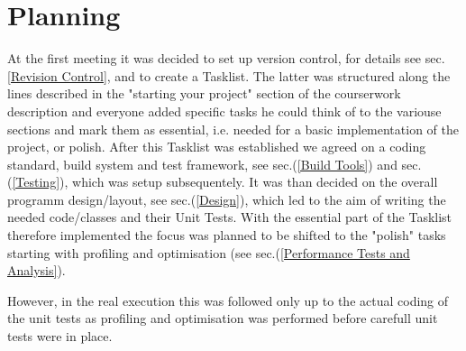 \section{Planning}
\label{Planning}
At the first meeting it was decided to set up version control, for details see sec.\ref{Revision Control}, and to create a Tasklist.
The latter was structured along the lines described in the "starting your project" section of the courserwork description and everyone
added specific tasks he could think of to the variouse sections and mark them as essential, i.e. needed for a basic implementation of the project, or polish.
After this Tasklist was established we agreed on a coding standard, build system and test framework, see sec.(\ref{Build Tools}) and sec.(\ref{Testing}), which was setup subsequentely.
It was than decided on the overall programm design/layout, see sec.(\ref{Design}), which led to the aim of writing the needed code/classes and their Unit Tests.
With the essential part of the Tasklist therefore implemented the focus was planned to be shifted to the "polish" tasks starting with profiling and optimisation (see sec.(\ref{Performance Tests and Analysis}).

However, in the real execution this was followed only up to the actual coding of the unit tests as profiling and optimisation was performed before carefull unit tests were in place. 